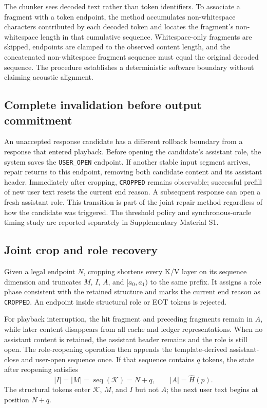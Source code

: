 The chunker sees decoded text rather than token identifiers. To associate a fragment with a token endpoint, the method accumulates non-whitespace characters contributed by each decoded token and locates the fragment's non-whitespace length in that cumulative sequence. Whitespace-only fragments are skipped, endpoints are clamped to the observed content length, and the concatenated non-whitespace fragment sequence must equal the original decoded sequence. The procedure establishes a deterministic software boundary without claiming acoustic alignment.

\subsection{Complete invalidation before output commitment}

An unaccepted response candidate has a different rollback boundary from a response that entered playback. Before opening the candidate's assistant role, the system saves the \texttt{USER\_OPEN} endpoint. If another stable input segment arrives, repair returns to this endpoint, removing both candidate content and its assistant header. Immediately after cropping, \texttt{CROPPED} remains observable; successful prefill of new user text resets the current end reason. A subsequent response can open a fresh assistant role. This transition is part of the joint repair method regardless of how the candidate was triggered. The threshold policy and synchronous-oracle timing study are reported separately in Supplementary Material S1.

\subsection{Joint crop and role recovery}

Given a legal endpoint $N$, cropping shortens every K/V layer on its sequence dimension and truncates $M$, $I$, $A$, and $[a_0,a_1)$ to the same prefix. It assigns a role phase consistent with the retained structure and marks the current end reason as \texttt{CROPPED}. An endpoint inside structural role or EOT tokens is rejected.

For playback interruption, the hit fragment and preceding fragments remain in $A$, while later content disappears from all cache and ledger representations. When no assistant content is retained, the assistant header remains and the role is still open. The role-reopening operation then appends the template-derived assistant-close and user-open sequence once. If that sequence contains $q$ tokens, the state after reopening satisfies
\begin{equation}
|I|=|M|=\operatorname{seq}(\mathcal{K})=N+q,
\qquad |A|=\widehat H(p).
\label{eq:post-reopen}
\end{equation}
The structural tokens enter $\mathcal{K}$, $M$, and $I$ but not $A$; the next user text begins at position $N+q$.

